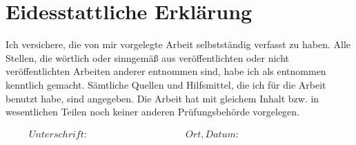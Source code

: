 \section*{Eidesstattliche Erklärung}
\thispagestyle{empty}

Ich versichere, die von mir vorgelegte Arbeit selbstständig verfasst zu haben. Alle Stellen, die wörtlich oder sinngemäß aus veröffentlichten oder nicht veröffentlichten Arbeiten anderer entnommen sind, habe ich als entnommen kenntlich gemacht. Sämtliche Quellen und Hilfsmittel, die ich für die Arbeit benutzt habe, sind angegeben. Die Arbeit hat mit gleichem Inhalt bzw. in wesentlichen Teilen noch keiner anderen Prüfungsbehörde vorgelegen.



\begin{displaymath}
\begin{array}{ll}
Unterschrift:~~~~~~~~~~~~~~~~~~~~~~~~~~~~~~~~~~~~~~~~~~
& Ort, Datum:~~~~~~~~~~~~~~~~~~~~~~~~~~~~~~~~~~~~~~~~~~
\end{array}
\end{displaymath}
